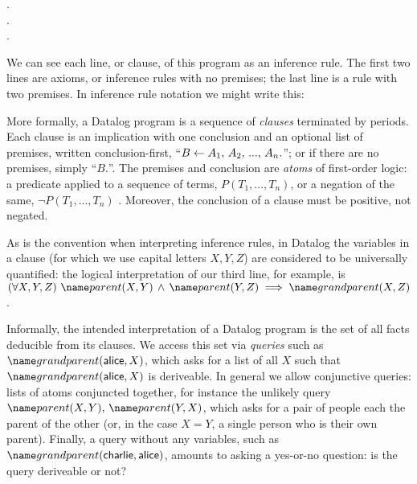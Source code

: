\begin{datalog}
  .
  \\
  .
  \\
   \gets {} \conj {}.
\end{datalog}

\noindent
We can see each line, or clause, of this program as an inference rule. The first
two lines are axioms, or inference rules with no premises; the last line is a
rule with two premises. In inference rule notation we might write this:
%
\begin{mathpar}


\end{mathpar}

\noindent
More formally, a Datalog program is a sequence of \emph{clauses} terminated by
periods. Each clause is an implication with one conclusion and an optional list
of premises, written conclusion-first, ``$B \gets A_1 \conj A_2 \conj ... \conj
A_n.$''; or if there are no premises, simply ``$B.$''. The premises and
conclusion are \emph{atoms} of first-order logic: a predicate applied to a
sequence of terms, $P(T_1, ..., T_n)$, or a negation of the same, $\neg P(T_1,
..., T_n)$%
.
%
%
Moreover, the conclusion of a clause must be positive, not negated.
%

As is the convention when interpreting inference rules, in Datalog the variables
in a clause (for which we use capital letters $X,Y,Z$) are considered to be
universally quantified: the logical interpretation of our third line, for
example, is $\fa{X, Y, Z} \atom{parent}{X, Y} \wedge \atom{parent}{Y, Z}
\implies \atom{grandparent}{X, Z}$.

Informally, the intended interpretation of a Datalog program is the set of all
facts deducible from its clauses.
%
We access this set via \emph{queries} such as
$\atom{grandparent}{\datum{alice},X}$, which asks for a list of all $X$ such
that $\atom{grandparent}{\datum{alice},X}$ is deriveable. In general we allow
conjunctive queries: lists of atoms conjuncted together, for instance the
unlikely query $\atom{parent}{X,Y} \conj \atom{parent}{Y,X}$, which asks for a
pair of people each the parent of the other (or, in the case $X = Y$, a single
person who is their own parent). Finally, a query without any variables, such as
$\atom{grandparent}{\datum{charlie}, \datum{alice}}$, amounts to asking a
yes-or-no question: is the query deriveable or not?

